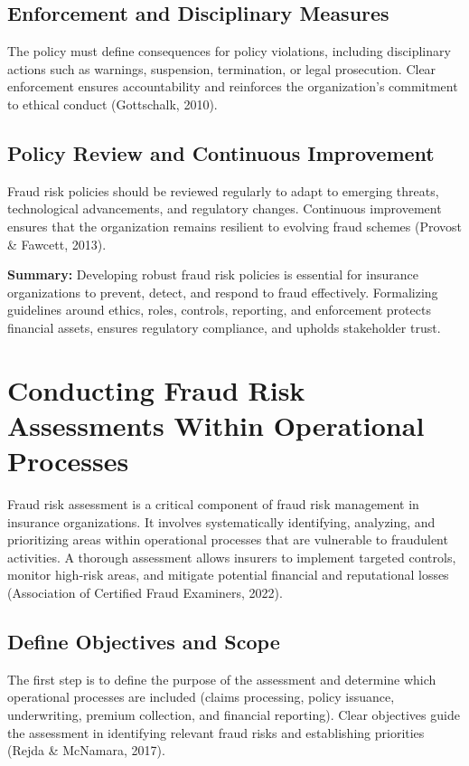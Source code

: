 \documentclass[12pt,a4paper]{article}
\begin{document}
\subsection{Enforcement and Disciplinary Measures}
The policy must define consequences for policy violations, including disciplinary actions such as warnings, suspension, termination, or legal prosecution. Clear enforcement ensures accountability and reinforces the organization’s commitment to ethical conduct (Gottschalk, 2010).

\subsection{Policy Review and Continuous Improvement}
Fraud risk policies should be reviewed regularly to adapt to emerging threats, technological advancements, and regulatory changes. Continuous improvement ensures that the organization remains resilient to evolving fraud schemes (Provost \& Fawcett, 2013).

\begin{example}
\textbf{Summary:} Developing robust fraud risk policies is essential for insurance organizations to prevent, detect, and respond to fraud effectively. Formalizing guidelines around ethics, roles, controls, reporting, and enforcement protects financial assets, ensures regulatory compliance, and upholds stakeholder trust.
\end{example}

\section{Conducting Fraud Risk Assessments Within Operational Processes}

Fraud risk assessment is a critical component of fraud risk management in insurance organizations. It involves systematically identifying, analyzing, and prioritizing areas within operational processes that are vulnerable to fraudulent activities. A thorough assessment allows insurers to implement targeted controls, monitor high-risk areas, and mitigate potential financial and reputational losses (Association of Certified Fraud Examiners, 2022).

\subsection{Define Objectives and Scope}
The first step is to define the purpose of the assessment and determine which operational processes are included (claims processing, policy issuance, underwriting, premium collection, and financial reporting). Clear objectives guide the assessment in identifying relevant fraud risks and establishing priorities (Rejda \& McNamara, 2017).
\end{document}
